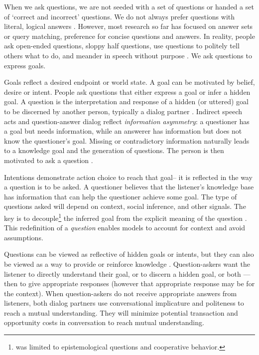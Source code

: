 When we ask questions, we are not seeded with a set of questions or handed a
set of `correct and incorrect' questions. We do not always prefer questions
with literal, logical answers \citep{rothe_lake_gureckis_2017, clark_1979}.
However, most research so far has focused on answer sets or query matching,
preference for concise questions and answers. In reality, people ask open-ended
questions, sloppy half questions, use questions to politely tell others
what to do, and meander in speech without purpose \citep{brown_1980}. We ask
questions to express goals.

Goals reflect a desired endpoint or world state. A goal can be motivated by
belief, desire or intent. People ask questions that either express a goal or
infer a hidden goal. A question is the interpretation and response of a hidden
(or uttered) goal to be discerned by another person, typically a dialog partner
\citep{hawkins_goodman_2017}. Indirect speech acts and question-answer dialog
reflect \emph{information asymmetry}: a questioner has a goal but needs
information, while an answerer has information but does not know the
questioner’s goal. Missing or contradictory information naturally leads to a
knowledge goal and the generation of questions. The person is then motivated to
ask a question \citep{alaimi_2020}.

Intentions demonstrate action choice to reach that goal-- it is reflected in
the way a question is to be asked. A questioner believes that the listener's
knowledge base has information that can help the questioner achieve some goal.
The type of questions asked will depend on context, social inference, and other
signals. The key is to decouple\footnote{\citet{hawkins_goodman_2017} was
limited to epistemological questions and cooperative behavior.} the inferred
goal from the explicit meaning of the question \citep{hawkins_goodman_2017}.
This redefinition of a \emph{question} enables models to account for context
and avoid assumptions.

Questions can be viewed as reflective of hidden goals or intents, but they can
also be viewed as a way to provide or reinforce knowledge \citep{alaimi_2020,
ray_2001}. Question-askers want the listener to directly understand
their goal, or to discern a hidden goal, or both --- then to give appropriate
responses (however that appropriate response may be for the context). When
question-askers do not receive appropriate answers from listeners, both dialog
partners use conversational implicature and politeness to reach a mutual
understanding. They will minimize potential transaction and opportunity costs
in conversation to reach mutual understanding.

